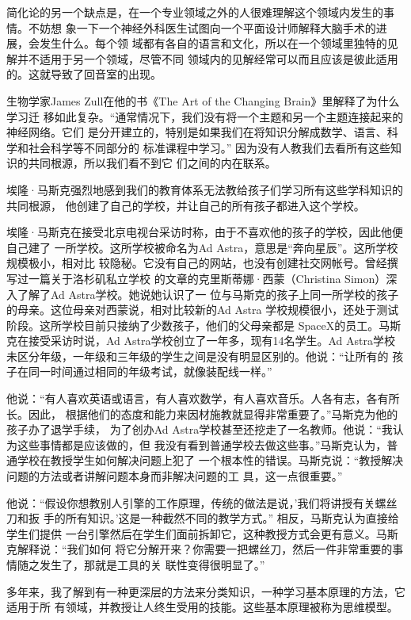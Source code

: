 \documentclass[11pt]{ctexart}
\begin{document}
{{{{简化论的另一个缺点是，在一个专业领域之外的人很难理解这个领域内发生的事情。不妨想
象一下一个神经外科医生试图向一个平面设计师解释大脑手术的进展，会发生什么。每个领
域都有各自的语言和文化，所以在一个领域里独特的见解并不适用于另一个领域，尽管不同
领域内的见解经常可以而且应该是彼此适用的。这就导致了回音室的出现。

生物学家James Zull在他的书《The Art of the Changing Brain》里解释了为什么学习迁
移如此复杂。“通常情况下，我们没有将一个主题和另一个主题连接起来的神经网络。它们
是分开建立的，特别是如果我们在将知识分解成数学、语言、科学和社会科学等不同部分的
标准课程中学习。” 因为没有人教我们去看所有这些知识的共同根源，所以我们看不到它
们之间的内在联系。

埃隆·马斯克强烈地感到我们的教育体系无法教给孩子们学习所有这些学科知识的共同根源，
他创建了自己的学校，并让自己的所有孩子都进入这个学校。

埃隆·马斯克在接受北京电视台采访时称，由于不喜欢他的孩子的学校，因此他便自己建了
一所学校。这所学校被命名为Ad Astra，意思是“奔向星辰”。这所学校规模极小，相对比
较隐秘。它没有自己的网站，也没有创建社交网帐号。曾经撰写过一篇关于洛杉矶私立学校
的文章的克里斯蒂娜·西蒙（Christina Simon）深入了解了Ad Astra学校。她说她认识了一
位与马斯克的孩子上同一所学校的孩子的母亲。这位母亲对西蒙说，相对比较新的Ad Astra
学校规模很小，还处于测试阶段。这所学校目前只接纳了少数孩子，他们的父母亲都是
SpaceX的员工。马斯克在接受采访时说，Ad Astra学校创立了一年多，现有14名学生。Ad
Astra学校未区分年级，一年级和三年级的学生之间是没有明显区别的。他说：“让所有的
孩子在同一时间通过相同的年级考试，就像装配线一样。”

他说：“有人喜欢英语或语言，有人喜欢数学，有人喜欢音乐。人各有志，各有所长。因此，
根据他们的态度和能力来因材施教就显得非常重要了。”马斯克为他的孩子办了退学手续，
为了创办Ad Astra学校甚至还挖走了一名教师。他说：“我认为这些事情都是应该做的，但
我没有看到普通学校去做这些事。”马斯克认为，普通学校在教授学生如何解决问题上犯了
一个根本性的错误。马斯克说：“教授解决问题的方法或者讲解问题本身而非解决问题的工
具，这一点很重要。”

他说：“假设你想教别人引擎的工作原理，传统的做法是说，’我们将讲授有关螺丝刀和扳
手的所有知识。’这是一种截然不同的教学方式。” 相反，马斯克认为直接给学生们提供
一台引擎然后在学生们面前拆卸它，这种教授方式会更有意义。马斯克解释说：“我们如何
将它分解开来？你需要一把螺丝刀，然后一件非常重要的事情随之发生了，那就是工具的关
联性变得很明显了。”

多年来，我了解到有一种更深层的方法来分类知识，一种学习基本原理的方法，它适用于所
有领域，并教授让人终生受用的技能。这些基本原理被称为思维模型。

}}}}
\end{document}
